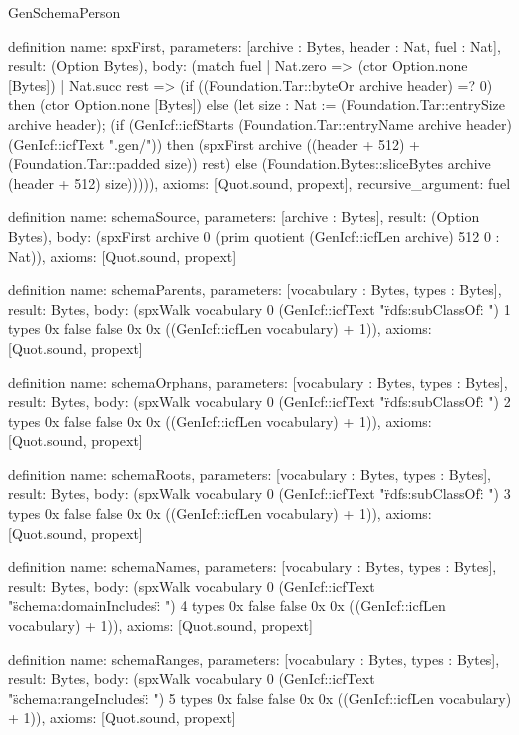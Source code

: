 \begin{lexlean}{GenSchemaPerson}
\begin{semanticmodule}
definition{
  name: spxFirst,
  parameters: [archive : Bytes, header : Nat, fuel : Nat],
  result: (Option Bytes),
  body: (match fuel
    | Nat.zero => (ctor Option.none [Bytes])
    | Nat.succ rest => (if ((Foundation.Tar::byteOr archive header) =? 0) then (ctor Option.none [Bytes]) else (let size : Nat := (Foundation.Tar::entrySize archive header); (if (GenIcf::icfStarts (Foundation.Tar::entryName archive header) (GenIcf::icfText ".gen/")) then (spxFirst archive ((header + 512) + (Foundation.Tar::padded size)) rest) else (Foundation.Bytes::sliceBytes archive (header + 512) size))))),
  axioms: [Quot.sound, propext],
  recursive_argument: fuel
}

definition{
  name: schemaSource,
  parameters: [archive : Bytes],
  result: (Option Bytes),
  body: (spxFirst archive 0 (prim quotient (GenIcf::icfLen archive) 512 0 : Nat)),
  axioms: [Quot.sound, propext]
}

definition{
  name: schemaParents,
  parameters: [vocabulary : Bytes, types : Bytes],
  result: Bytes,
  body: (spxWalk vocabulary 0 (GenIcf::icfText "\"rdfs:subClassOf\": ") 1 types 0x false false 0x 0x ((GenIcf::icfLen vocabulary) + 1)),
  axioms: [Quot.sound, propext]
}

definition{
  name: schemaOrphans,
  parameters: [vocabulary : Bytes, types : Bytes],
  result: Bytes,
  body: (spxWalk vocabulary 0 (GenIcf::icfText "\"rdfs:subClassOf\": ") 2 types 0x false false 0x 0x ((GenIcf::icfLen vocabulary) + 1)),
  axioms: [Quot.sound, propext]
}

definition{
  name: schemaRoots,
  parameters: [vocabulary : Bytes, types : Bytes],
  result: Bytes,
  body: (spxWalk vocabulary 0 (GenIcf::icfText "\"rdfs:subClassOf\": ") 3 types 0x false false 0x 0x ((GenIcf::icfLen vocabulary) + 1)),
  axioms: [Quot.sound, propext]
}

definition{
  name: schemaNames,
  parameters: [vocabulary : Bytes, types : Bytes],
  result: Bytes,
  body: (spxWalk vocabulary 0 (GenIcf::icfText "\"schema:domainIncludes\": ") 4 types 0x false false 0x 0x ((GenIcf::icfLen vocabulary) + 1)),
  axioms: [Quot.sound, propext]
}

definition{
  name: schemaRanges,
  parameters: [vocabulary : Bytes, types : Bytes],
  result: Bytes,
  body: (spxWalk vocabulary 0 (GenIcf::icfText "\"schema:rangeIncludes\": ") 5 types 0x false false 0x 0x ((GenIcf::icfLen vocabulary) + 1)),
  axioms: [Quot.sound, propext]
}


\end{semanticmodule}
\end{lexlean}
